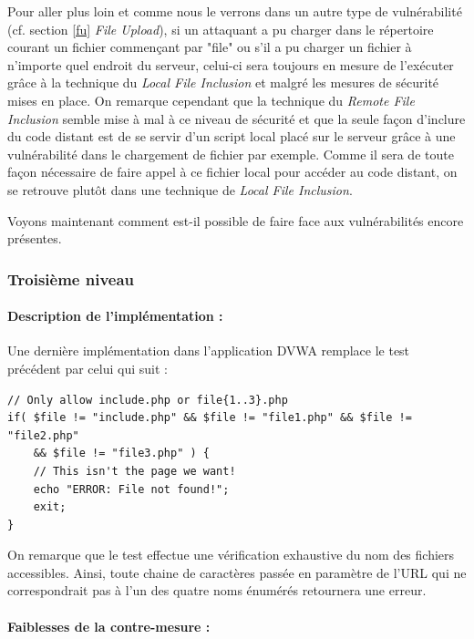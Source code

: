 Pour aller plus loin et comme nous le verrons dans un autre type de vulnérabilité (cf. section \ref{fu} \textit{File Upload}), si un attaquant a pu charger dans le répertoire courant un fichier commençant par "file" ou s'il a pu charger un fichier à n'importe quel endroit du serveur, celui-ci sera toujours en mesure de l'exécuter grâce à la technique du \textit{Local File Inclusion} et malgré les mesures de sécurité mises en place. On remarque cependant que la technique du \textit{Remote File Inclusion} semble mise à mal à ce niveau de sécurité et que la seule façon d'inclure du code distant est de se servir d'un script local placé sur le serveur grâce à une vulnérabilité dans le chargement de fichier par exemple. Comme il sera de toute façon nécessaire de faire appel à ce fichier local pour accéder au code distant, on se retrouve plutôt dans une technique de \textit{Local File Inclusion}. 

Voyons maintenant comment est-il possible de faire face aux vulnérabilités encore présentes.

\subsubsection{Troisième niveau}

\paragraph{Description de l'implémentation :}

Une dernière implémentation dans l'application DVWA remplace le test précédent par celui qui suit :

\begin{lstlisting}
// Only allow include.php or file{1..3}.php
if( $file != "include.php" && $file != "file1.php" && $file != "file2.php" 
    && $file != "file3.php" ) {
    // This isn't the page we want!
    echo "ERROR: File not found!";
    exit;
}
\end{lstlisting}

On remarque que le test effectue une vérification exhaustive du nom des fichiers accessibles. Ainsi, toute chaine de caractères passée en paramètre de l'URL qui ne correspondrait pas à l'un des quatre noms énumérés retournera une erreur.

\paragraph{Faiblesses de la contre-mesure :}

